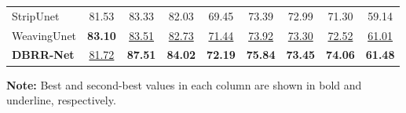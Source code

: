 \documentclass[a4paper,fleqn, review]{cas-sc}
\begin{document}
\begin{table}[pos=t]
{\begin{tabular}{lcccccccc}
StripUnet \cite{stripunet}
  & 81.53 & 83.33 & 82.03 & 69.45 & 73.39 & 72.99 & 71.30 & 59.14 \\
WeavingUnet \cite{weavingunet}
  & \textbf{83.10} & \underline{83.51} & \underline{82.73} & \underline{71.44}
  & \underline{73.92} & \underline{73.30} & \underline{72.52} & \underline{61.01} \\
\midrule
\textbf{DBRR-Net}
  & \underline{81.72} & \textbf{87.51} & \textbf{84.02} & \textbf{72.19}
  & \textbf{75.84} & \textbf{73.45} & \textbf{74.06} & \textbf{61.48} \\
\bottomrule
\end{tabular}%
}
\vspace{2pt}
\begin{minipage}{\textwidth}
\raggedright
\footnotesize
\textbf{Note:} Best and second-best values in each column are shown in bold
and underline, respectively.
\end{minipage}
\end{table}
\end{document}
